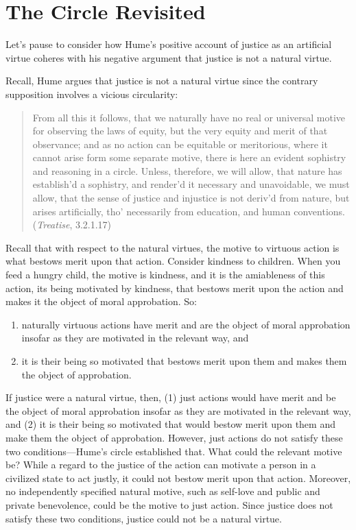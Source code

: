 
\section{The Circle Revisited}\label{sec:the_circle_revisited} %

Let's pause to consider how Hume's positive account of justice as an artificial virtue coheres with his negative argument that justice is not a natural virtue.

Recall, Hume argues that justice is not a natural virtue since the contrary supposition involves a vicious circularity:
\begin{quote}
    From all this it follows, that we naturally have no real or universal motive for observing the laws of equity, but the very equity and merit of that observance; and as no action can be equitable or meritorious, where it cannot arise form some separate motive, there is here an evident sophistry and reasoning in a circle. Unless, therefore, we will allow, that nature has establish’d a sophistry, and render’d it necessary and unavoidable, we must allow, that the sense of justice and injustice is not deriv’d from nature, but arises artificially, tho’ necessarily from education, and human conventions. (\emph{Treatise}, 3.2.1.17)
\end{quote}

Recall that with respect to the natural virtues, the motive to virtuous action is what bestows merit upon that action. Consider kindness to children. When you feed a hungry child, the motive is kindness, and it is the amiableness of this action, its being motivated by kindness, that bestows merit upon the action and makes it the object of moral approbation. So: 
\begin{enumerate}
    \item naturally virtuous actions have merit and are the object of moral approbation insofar as they are motivated in the relevant way, and 
    \item it is their being so motivated that bestows merit upon them and makes them the object of approbation.
\end{enumerate}

If justice were a natural virtue, then, (1) just actions would have merit and be the object of moral approbation insofar as they are motivated in the relevant way, and (2) it is their being so motivated that would bestow merit upon them and make them the object of approbation. However, just actions do not satisfy these two conditions---Hume's circle established that. What could the relevant motive be? While a regard to the justice of the action can motivate a person in a civilized state to act justly, it could not bestow merit upon that action. Moreover, no independently specified natural motive, such as self-love and public and private benevolence, could be the motive to just action. Since justice does not satisfy these two conditions, justice could not be a natural virtue.

